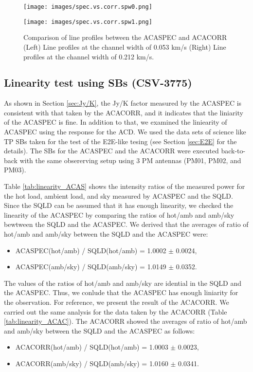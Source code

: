 \begin{figure}[htbp]
  \begin{minipage}[b]{0.48\linewidth}
    \centering
    \texttt{[image: images/spec.vs.corr.spw0.png]}
  \end{minipage}
  \begin{minipage}[b]{0.48\linewidth}
    \centering
    \texttt{[image: images/spec.vs.corr.spw1.png]}
  \end{minipage}
    \caption{Comparison of line profiles between the ACASPEC and ACACORR (Left) Line profiles at the channel width of 0.053 km/s (Right) Line profiles at the channel width of 0.212 km/s.}
    \label{fig:FPS}
\end{figure}


\subsection{Linearity test using SBs (CSV-3775)}\label{sec:linearitySB}

As shown in Section \ref{sec:Jy/K}, the Jy/K factor measured by the ACASPEC is consistent with that taken by the ACACORR, and it indicates that the liniarity of the ACASPEC is fine. In addition to that, we examined the liniearity of ACASPEC using the response for the ACD. We used the data sets of science like TP SBs taken for the test of the E2E-like tesing (see Section \ref{sec:E2E} for the details). The SBs for the ACASPEC and the ACACORR were executed back-to-back with the same obsererving setup using 3 PM antennas (PM01, PM02, and PM03).

Table \ref{tab:linearity_ACAS} shows the intensity ratios of the measured power for the hot load, ambient load, and sky measured by ACASPEC and the SQLD. Since the SQLD can be assumed that it has enough linearity, we checked the linearity of the ACASPEC by comparing the ratios of hot/amb and amb/sky bewtween the SQLD and the ACASPEC. We derived that the averages of ratio of hot/amb and amb/sky between the SQLD and the ACASPEC were:
\begin{itemize}
\item ACASPEC(hot/amb) / SQLD(hot/amb) = 1.0002 $\pm$ 0.0024,
\item ACASPEC(amb/sky) / SQLD(amb/sky) = 1.0149 $\pm$ 0.0352.
\end{itemize}
The values of the ratios of hot/amb and amb/sky are idential in the SQLD and the ACASPEC. Thus, we conlude that the ACASPEC has enough liniarity for the observation. For reference, we present the result of the ACACORR. We carried out the same analysis for the data taken by the ACACORR (Table \ref{tab:linearity_ACAC}). The ACACORR showed the averages of ratio of hot/amb and amb/sky between the SQLD and the ACASPEC as follows:
\begin{itemize}
\item ACACORR(hot/amb) / SQLD(hot/amb) = 1.0003 $\pm$ 0.0023,
\item ACACORR(amb/sky) / SQLD(amb/sky) = 1.0160 $\pm$ 0.0341.
\end{itemize}

